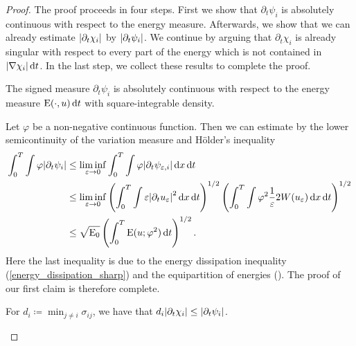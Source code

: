 \begin{proof}
	The proof proceeds in four steps. First we show that $ \partial_{ t } 
	\psi_{ i } $ is absolutely continuous with respect to the energy measure. 
	Afterwards, we show that we can already estimate $ \abs{ \partial_{ t } 
	\chi_{ i } } $ by $ \abs{ \partial_{ t } \psi_{ i } } $. 
	We continue by arguing that $ \partial_{ t } \chi_{ i } $ is 
	already singular with respect to every part of the energy which is not 
	contained in $ \abs{ \nabla \chi_{ i } } \dd{ t } $. In the last step, we 
	collect these results to complete the proof.
	
	\begin{description}[wide=0pt]
		\item[Step 1:] The signed measure $ \partial_{  t } \psi_{ i } $ is 
		absolutely continuous with respect to the energy measure $ \operatorname{E} ( 
		\cdot, u ) \dd{t } $ with square-integrable density.
		
		Let $ \varphi $ be a non-negative continuous function. Then we can 
		estimate by the 
		lower semicontinuity of the variation measure and
		Hölder's inequality
		\begin{align}
			\notag
			\int_{ 0 }^{ T }
				\int
					\varphi
			\abs{\partial_{ t } \psi_{ i }}
			& \leq
			\liminf_{ \varepsilon \to 0 }
			\int_{ 0 }^{ T }
			\int
			\varphi
			\abs{ \partial_{ t } \psi_{ \varepsilon ,i } }
			\dd{ x }
			\dd{ t }
			\\
			\notag
			& \leq
			\liminf_{ \varepsilon \to 0 }
			\left(
			\int_{ 0 }^{ T }
			\int
			\varepsilon 
			\abs{ \partial_{ t } u_{ \varepsilon } }^{ 2 }
			\dd{ x }
			\dd{ t }
			\right)^{ 1/2 }
			\left(
			\int_{ 0 }^{ T }
			\int
			\varphi^{ 2 }
			\frac{ 1 }{ \varepsilon }
			2 W ( u_{ \varepsilon } )
			\dd{ x }
			\dd{ t }
			\right)^{ 1/2 }
			\\
			\label{inequality_from_step_1}
			& \leq
			\sqrt{ \operatorname{E}_{ 0 } }
			\left(
			\int_{ 0 }^{ T }
			\operatorname{E} ( u ; \varphi^{ 2 } )
			\dd{ t }
			\right)^{ 1/2 }.
		\end{align}
		Here the last inequality is due to the energy dissipation inequality
		(\ref{energy_dissipation_sharp}) and the equipartition of energies 
		().
		The proof of our first claim is therefore complete.
		
		\item[Step 2:] For $ d_{ i } \coloneqq \min_{ j \neq i } \sigma_{ i j } 
		$, we have 
		that $ d_{ i } \abs{ \partial_{ t } \chi_{ i } } \leq \abs{ \partial_{ 
		t } \psi_{ i } } $.
		

\end{description}
\end{proof}
